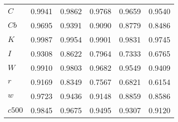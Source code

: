 \begin{center}
\begin{longtable}{lccccc}
$C         $	 & 	    0.9941	 & 	    0.9862	 & 	    0.9768	 & 	    0.9659	 & 	    0.9540 \\ 
$Cb        $	 & 	    0.9695	 & 	    0.9391	 & 	    0.9090	 & 	    0.8779	 & 	    0.8486 \\ 
$K         $	 & 	    0.9987	 & 	    0.9954	 & 	    0.9901	 & 	    0.9831	 & 	    0.9745 \\ 
$I         $	 & 	    0.9308	 & 	    0.8622	 & 	    0.7964	 & 	    0.7333	 & 	    0.6765 \\ 
$W         $	 & 	    0.9910	 & 	    0.9803	 & 	    0.9682	 & 	    0.9549	 & 	    0.9409 \\ 
$r         $	 & 	    0.9169	 & 	    0.8349	 & 	    0.7567	 & 	    0.6821	 & 	    0.6154 \\ 
$w         $	 & 	    0.9723	 & 	    0.9436	 & 	    0.9148	 & 	    0.8859	 & 	    0.8586 \\ 
$c500      $	 & 	    0.9845	 & 	    0.9675	 & 	    0.9495	 & 	    0.9307	 & 	    0.9120 \\ 
\end{longtable}
 \end{center}
